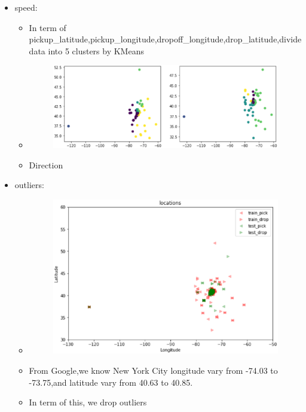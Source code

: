 \documentclass[
 size=14pt,
 paper=smartboard,  %
 mode=present, 		%
 display=slides, 	%
 style=tuliplab,  	%
 pauseslide,
 fleqn,leqno]{powerdot}
\begin{document}
\begin{slide}[toc=,bm=]{}
  \begin{itemize}
  \item speed:
  \begin{itemize}
    \item In term of pickup_latitude,pickup_longitude,dropoff_longitude,drop_latitude,divide data into 5 clusters by KMeans
    \item \begin{figure}\includegraphics[scale=0.4]{figures/15.eps}\end{figure}
    \item Direction
  \end{itemize}
\end{itemize}
\end{slide}


\begin{slide}[toc=,bm=]{}
  \begin{itemize}
  \item outliers:
  \begin{itemize}
    \item \begin{figure}\includegraphics[scale=0.4]{figures/16.eps}\end{figure}
    \item From Google,we know New York City longitude vary from -74.03 to -73.75,and latitude vary from 40.63 to 40.85.
    \item In term of this, we drop outliers
  \end{itemize}
\end{itemize}
\end{slide}
\end{document}
